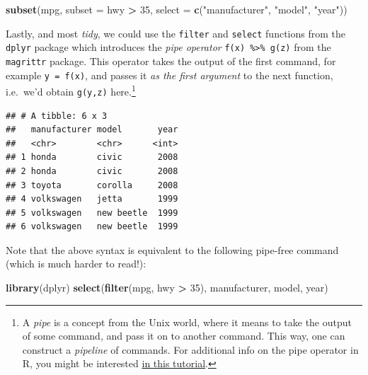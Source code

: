 \documentclass[]{book}
\newenvironment{Shaded}{\begin{snugshade}}{\end{snugshade}}
\newcommand{\KeywordTok}[1]{\textcolor[rgb]{0.13,0.29,0.53}{\textbf{#1}}}
\newcommand{\DataTypeTok}[1]{\textcolor[rgb]{0.13,0.29,0.53}{#1}}
\newcommand{\DecValTok}[1]{\textcolor[rgb]{0.00,0.00,0.81}{#1}}
\newcommand{\StringTok}[1]{\textcolor[rgb]{0.31,0.60,0.02}{#1}}
\newcommand{\OperatorTok}[1]{\textcolor[rgb]{0.81,0.36,0.00}{\textbf{#1}}}
\newcommand{\NormalTok}[1]{#1}
\begin{document}
\begin{Shaded}
\begin{Highlighting}[]
\KeywordTok{subset}\NormalTok{(mpg, }\DataTypeTok{subset =}\NormalTok{ hwy }\OperatorTok{>}\StringTok{ }\DecValTok{35}\NormalTok{, }\DataTypeTok{select =} \KeywordTok{c}\NormalTok{(}\StringTok{"manufacturer"}\NormalTok{, }\StringTok{"model"}\NormalTok{, }\StringTok{"year"}\NormalTok{))}
\end{Highlighting}
\end{Shaded}

Lastly, and most \emph{tidy}, we could use the \texttt{filter} and
\texttt{select} functions from the \texttt{dplyr} package which
introduces the \emph{pipe operator}
\texttt{f(x)\ \%\textgreater{}\%\ g(z)} from the \texttt{magrittr}
package. This operator takes the output of the first command, for
example \texttt{y\ =\ f(x)}, and passes it \emph{as the first argument}
to the next function, i.e.~we'd obtain \texttt{g(y,z)} here.\footnote{A
  \emph{pipe} is a concept from the Unix world, where it means to take
  the output of some command, and pass it on to another command. This
  way, one can construct a \emph{pipeline} of commands. For additional
  info on the pipe operator in R, you might be interested
  \href{https://www.datacamp.com/community/tutorials/pipe-r-tutorial}{in
  this tutorial}.}

\begin{Shaded}
\end{Shaded}

\begin{verbatim}
## # A tibble: 6 x 3
##   manufacturer model       year
##   <chr>        <chr>      <int>
## 1 honda        civic       2008
## 2 honda        civic       2008
## 3 toyota       corolla     2008
## 4 volkswagen   jetta       1999
## 5 volkswagen   new beetle  1999
## 6 volkswagen   new beetle  1999
\end{verbatim}

Note that the above syntax is equivalent to the following pipe-free
command (which is much harder to read!):

\begin{Shaded}
\begin{Highlighting}[]
\KeywordTok{library}\NormalTok{(dplyr)}
\KeywordTok{select}\NormalTok{(}\KeywordTok{filter}\NormalTok{(mpg, hwy }\OperatorTok{>}\StringTok{ }\DecValTok{35}\NormalTok{), manufacturer, model, year)}
\end{Highlighting}
\end{Shaded}
\end{document}

